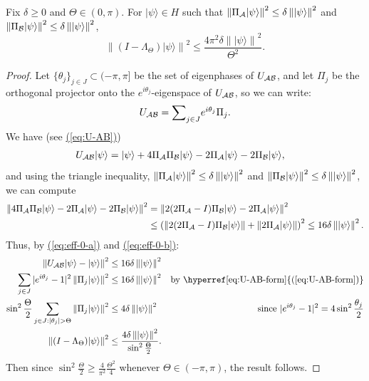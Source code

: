 \documentclass{theoretics}
\newcommand{\eq}[1]{\hyperref[eq:#1]{(\ref*{eq:#1})}}
\def\ket#1{{\lvert}#1\rangle}
\renewcommand{\>}{\rangle}
\newcommand{\<}{\langle}
\renewcommand{\(}{\left(}
\renewcommand{\)}{\right)}
\def\norm#1{\left\| #1 \right\|}
\begin{document}
\begin{lemma}\label{lem:effectively-zero}
Fix $\delta\geq0$ and $\Theta\in (0,\pi)$. For $\ket{\psi}\in H$ such that $\norm{\Pi_{\cal A}\ket{\psi}}^2\leq \delta\norm{\ket{\psi}}^2$ and  $\norm{\Pi_{\cal B}\ket{\psi}}^2\leq \delta\norm{\ket{\psi}}^2$, 
\begin{equation*}
\norm{(I-\Lambda_\Theta)\ket{\psi}}^2  \leq \frac{4\pi^2\delta\norm{\ket{\psi}}^2}{\Theta^2}.
\end{equation*}
\end{lemma}
\begin{proof}
Let $\{\theta_j\}_{j\in J}\subset (-\pi,\pi]$ be the set of eigenphases of $U_{\cal AB}$, and let $\Pi_j$ be the orthogonal projector onto the $e^{i\theta_j}$-eigenspace of $U_{\cal AB}$, so we can write:
\begin{equation}
U_{\cal AB} = \textstyle{\displaystyle\sum}_{j\in J} e^{i\theta_j}\Pi_j.\label{eq:U-AB-form}
\end{equation}
We have (see \eq{U-AB})
\begin{align}
U_{\cal AB}\ket{\psi} &= \ket{\psi} + 4\Pi_{\cal A}\Pi_{\cal B}\ket{\psi}-2\Pi_{\cal A}\ket{\psi}-2\Pi_{\cal B}\ket{\psi},\label{eq:eff-0-a}
\end{align}
and using the triangle inequality, $\norm{\Pi_{\cal A}\ket{\psi}}^2\leq \delta\norm{\ket{\psi}}^2$ and $\norm{\Pi_{\cal B}\ket{\psi}}^2 \leq \delta\norm{\ket{\psi}}^2$, we can compute
\begin{equation}
\begin{split}
\norm{4\Pi_{\cal A}\Pi_{\cal B}\ket{\psi}-2\Pi_{\cal A}\ket{\psi}-2\Pi_{\cal B}\ket{\psi}}^2 
&= \norm{2(2\Pi_{\cal A}-I)\Pi_{\cal B}\ket{\psi}-2\Pi_{\cal A}\ket{\psi}}^2\\
&\leq \left(\norm{2(2\Pi_{\cal A}-I)\Pi_{\cal B}\ket{\psi}} + \norm{2\Pi_{\cal A}\ket{\psi}}\right)^2 
\leq 16\delta\norm{\ket{\psi}}^2.
\end{split}\label{eq:eff-0-b}
\end{equation}
Thus, by \eq{eff-0-a} and \eq{eff-0-b}:
\begin{align*}
\norm{U_{\cal AB}\ket{\psi}-\ket{\psi}}^2 &\leq 16\delta\norm{\ket{\psi}}^2\\
\sum_{j\in J}|e^{i\theta_j}-1|^2\norm{\Pi_j\ket{\psi}}^2 & \leq 16\delta\norm{\ket{\psi}}^2 & \mbox{by \eq{U-AB-form}}\\
\sin^2\frac{\Theta}{2}\sum_{j\in J:|\theta_j|>\Theta}\norm{\Pi_j\ket{\psi}}^2 & \leq 4\delta\norm{\ket{\psi}}^2 & \mbox{since }|e^{i\theta_j}-1|^2 = 4\sin^2\frac{\theta_j}{2}\\
\norm{(I-\Lambda_\Theta)\ket{\psi}}^2 & \leq \frac{4\delta\norm{\ket{\psi}}^2}{\sin^2\frac{\Theta}{2}}.
\end{align*}
Then since $\sin^2\frac{\Theta}{2}\geq \frac{4}{\pi^2}\frac{\Theta^2}{4}$ whenever $\Theta\in (-\pi,\pi)$, the result follows.
\end{proof}
\end{document}
